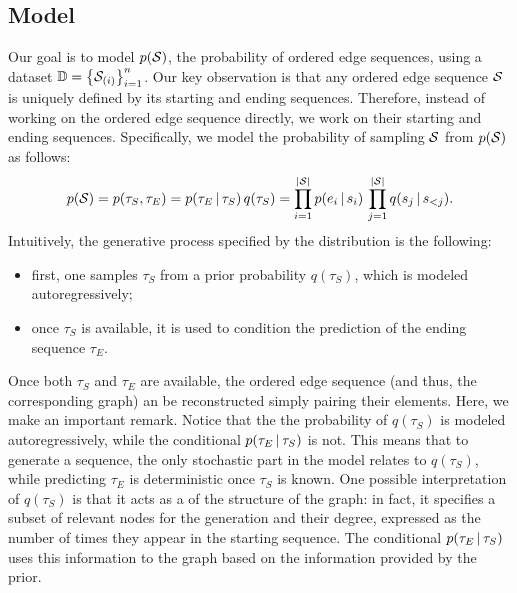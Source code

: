 \subsection{Model}
Our goal is to model $p(\OES{S})$, the probability of ordered edge sequences, using a dataset $\Data = \Set{\OES{S}_{(i)}}_{i=1}^n$. Our key observation is that any ordered edge sequence $\OES{S}$ is uniquely defined by its starting and ending sequences. Therefore, instead of working on the ordered edge sequence directly, we work on their starting and ending sequences. Specifically, we model the probability of sampling $\OES{S}$ from $p(\OES{S})$ as follows:
$$p(\OES{S}) = p(\tau_S, \tau_E) = p(\tau_E \given \tau_S)\, q(\tau_S) = \prod_{i=1}^{|\OES{S}|} p(e_i \given s_i)\, \prod_{j=1}^{|\OES{S}|} q(s_j \given s_{<j}).$$
Intuitively, the generative process specified by the distribution is the following:
\begin{itemize}
    \item first, one samples $\tau_S$ from a prior probability $q(\tau_S)$, which is modeled autoregressively;
    \item once $\tau_S$ is available, it is used to condition the prediction of the ending sequence $\tau_E$.
\end{itemize}
Once both $\tau_S$ and $\tau_E$ are available, the ordered edge sequence (and thus, the corresponding graph) an be reconstructed simply pairing their elements. Here, we make an important remark. Notice that the the probability of $q(\tau_S)$ is modeled autoregressively, while the conditional $p(\tau_E \,|\, \tau_S)$ is not. This means that to generate a sequence, the only stochastic part in the model relates to $q(\tau_S)$, while predicting $\tau_E$ is deterministic once $\tau_S$ is known. One possible interpretation of $q(\tau_S)$ is that it acts as a  of the structure of the graph: in fact, it specifies a subset of relevant nodes for the generation and their degree, expressed as the number of times they appear in the starting sequence. The conditional $p(\tau_E \,|\, \tau_S)$ uses this information to  the graph based on the information provided by the prior.

